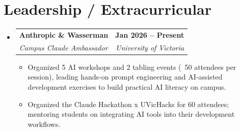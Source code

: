\documentclass[letterpaper,11pt]{article}
\makeatletter
\newcommand{\resumeItem}[1]{
  \item\small{
    {#1 \vspace{-2pt}}
  }
}
\newcommand{\resumeSubheading}[4]{
  \vspace{-2pt}\item
    \begin{tabular*}{1.0\textwidth}[t]{l@{\extracolsep{\fill}}r}
      \textbf{#1} & \textbf{\small #2} \\
      \textit{\small#3} & \textit{\small #4} \\
    \end{tabular*}\vspace{-7pt}
}
\newcommand{\resumeSubHeadingListStart}{\begin{itemize}[leftmargin=0.0in, label={}]}
\newcommand{\resumeSubHeadingListEnd}{\end{itemize}}
\newcommand{\resumeItemListStart}{\begin{itemize}}
\newcommand{\resumeItemListEnd}{\end{itemize}\vspace{-5pt}}
\makeatother
\begin{document}
\section{Leadership / Extracurricular}
    \resumeSubHeadingListStart
        \resumeSubheading{Anthropic \& Wasserman}{Jan 2026 -- Present}{Campus Claude Ambassador}{University of Victoria}
            \resumeItemListStart
                \resumeItem{Organized 5 AI workshops and 2 tabling events (~50 attendees per session), leading hands-on prompt engineering and AI-assisted development exercises to build practical AI literacy on campus.}
                \resumeItem{Organized the Claude Hackathon x UVicHacks for 60 attendees; mentoring students on integrating AI tools into their development workflows.}
            \resumeItemListEnd
    \resumeSubHeadingListEnd
\end{document}
